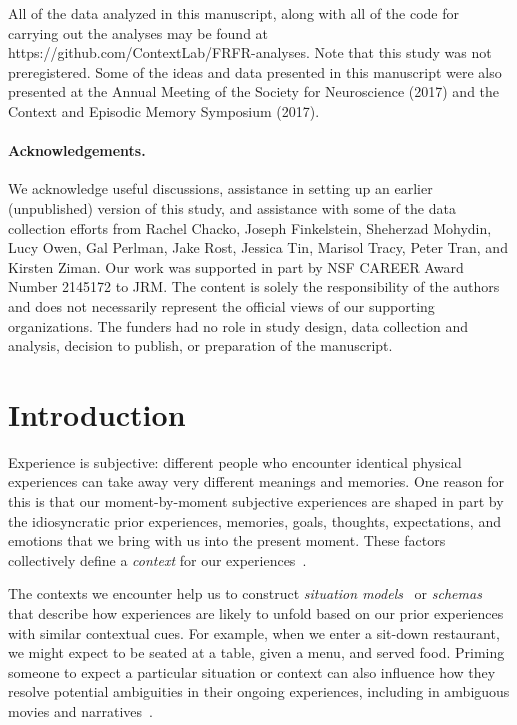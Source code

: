 \documentclass[11pt]{article}
\begin{document}
\begin{titlepage}
All of the data analyzed in this manuscript, along with all of the code for
carrying out the analyses may be found at
https://github.com/ContextLab/FRFR-analyses. Note that this study was not
preregistered.  Some of the ideas and data presented in this manuscript
were also presented at the Annual Meeting of the Society for Neuroscience (2017)
and the Context and Episodic Memory Symposium (2017).

\paragraph*{Acknowledgements.}

We acknowledge useful discussions, assistance in setting up an earlier
(unpublished) version of this study, and assistance with some of the data
collection efforts from Rachel Chacko, Joseph Finkelstein, Sheherzad Mohydin,
Lucy Owen, Gal Perlman, Jake Rost, Jessica Tin, Marisol Tracy,
Peter Tran, and Kirsten Ziman. Our work was supported in part by NSF CAREER Award Number
2145172 to JRM. The content is solely the responsibility of the authors and
does not necessarily represent the official views of our supporting
organizations. The funders had no role in study design, data collection and
analysis, decision to publish, or preparation of the manuscript.

\end{titlepage}

\normalsize

\section*{Introduction}


Experience is subjective: different people who encounter identical physical
experiences can take away very different meanings and memories. One reason for this is
that our moment-by-moment subjective experiences are shaped in part by the
idiosyncratic prior experiences, memories, goals, thoughts, expectations, and
emotions that we bring with us into the present moment. These factors
collectively define a \textit{context} for our experiences~\citep{Mann20}.


The contexts we encounter help us to construct \textit{situation
models}~\citep{RangRitc12, MannEtal15, RadvCope06, ZwaaEtal95, ZwaaRadv98} or
\textit{schemas}~\citep{MasiEtal22, BaldEtal18, TseEtal07} that describe how
experiences are likely to unfold based on our prior experiences with similar
contextual cues. For example, when we enter a sit-down restaurant, we might
expect to be seated at a table, given a menu, and served food. Priming someone
to expect a particular situation or context can also influence how they resolve
potential ambiguities in their ongoing experiences, including in ambiguous
movies and narratives~\citep{YeshEtal17, RissEtal03}.
\end{document}

